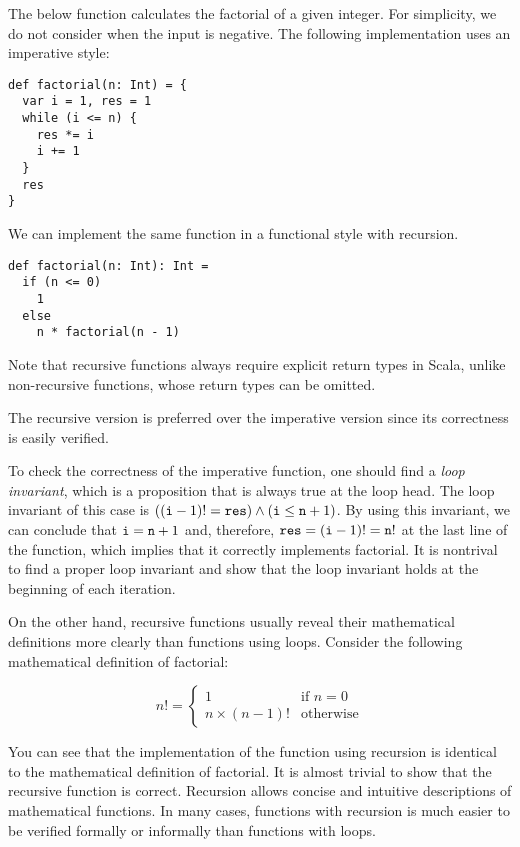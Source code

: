 The below  function calculates the factorial of a given integer.
For simplicity, we do not consider when the input is negative.
The following implementation uses an imperative style:

\begin{verbatim}
def factorial(n: Int) = {
  var i = 1, res = 1
  while (i <= n) {
    res *= i
    i += 1
  }
  res
}
\end{verbatim}

We can implement the same function in a functional style with recursion.

\begin{verbatim}
def factorial(n: Int): Int =
  if (n <= 0)
    1
  else
    n * factorial(n - 1)
\end{verbatim}

Note that recursive functions always require explicit return types in Scala,
unlike non-recursive functions, whose return types can be omitted.

The recursive version is preferred over the imperative version since its
correctness is easily verified.

To check the correctness of the imperative
 function, one should find a \textit{loop invariant},
which is a proposition that is always true at the loop head.
The loop invariant of this case is
$((\texttt{i}-1)!=\texttt{res})\land(\texttt{i}\le\texttt{n}+1)$.
By using this invariant, we can conclude that $\texttt{i}=\texttt{n}+1$ and,
therefore, $\texttt{res}=(\texttt{i}-1)!=\texttt{n}!$ at the last line of the
function, which implies that it correctly implements factorial.
It is nontrival to find a proper loop invariant and show that the loop invariant
holds at the beginning of each iteration.

On the other hand,
recursive functions usually reveal their mathematical definitions more clearly
than functions using loops. Consider the following mathematical definition of
factorial:

\[n!=\begin{cases}1 & \text{if } n=0\\n \times (n-1)! &
\text{otherwise}\end{cases}\]

You can see that the implementation of the  function using recursion
is identical to the mathematical definition of factorial. It is almost trivial
to show that the recursive  function is correct.
Recursion allows concise and intuitive descriptions of mathematical functions.
In many cases, functions with recursion is much easier to be verified formally
or informally than functions with loops.

